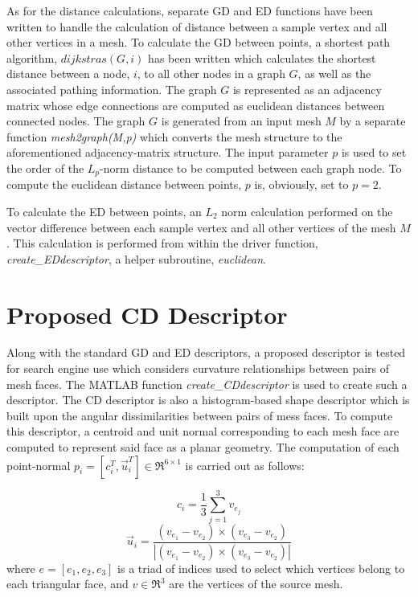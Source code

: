 \documentclass[12pt]{article}
\begin{document}
	\noindent
	As for the distance calculations, separate GD and ED functions have been written to handle the calculation of distance between a sample vertex and all other vertices in a mesh. To calculate the GD between points, a shortest path algorithm, $dijkstras(G,i)$ has been written which calculates the shortest  distance between a node, $i$, to all other nodes in a graph $G$, as well as the associated pathing information. The graph $G$ is represented as an adjacency matrix whose edge connections are computed as euclidean distances between connected nodes. The graph $G$ is generated from an input mesh $M$ by a separate function \emph{mesh2graph(M,p)} which converts the mesh structure to the aforementioned adjacency-matrix structure. The input parameter $p$ is used to set the order of the $L_{p}$-norm distance to be computed between each graph node. To compute the euclidean distance between points, $p$ is, obviously, set to $p=2$.
	
	\noindent
	To calculate the ED between points, an $L_{2}$ norm calculation performed on the vector difference between each \ith sample vertex and all other vertices of the mesh $M$. This calculation is performed from within the driver function, \emph{create\_EDdescriptor}, a helper subroutine, \emph{euclidean}.


\section*{Proposed CD Descriptor}

	\noindent
	Along with the standard GD and ED descriptors, a proposed descriptor is tested for search engine use which considers curvature relationships between pairs of mesh faces. The MATLAB function  \emph{create\_CDdescriptor} is used to create such a descriptor. The CD descriptor is also a histogram-based shape descriptor which is built upon the angular dissimilarities between pairs of mess faces. To compute this descriptor, a centroid and unit normal corresponding to each mesh face are computed to represent said face as a planar geometry. The computation of each \ith point-normal $p_{i} = [ c_{i}^T, \vec{u}_{i}^T ] \in \Re^{6\times1}$ is carried out as follows:

	\begin{equation}
		c_{i} = \frac{1}{3}\sum_{j=1}^{3} v_{e_{j}}
	\end{equation}
	\begin{equation}
		\vec{u}_{i} = \frac{( v_{e_{1}} - v_{e_{2}}) \times ( v_{e_{3}} - v_{e_{2}})}{|( v_{e_{1}} - v_{e_{2}}) \times ( v_{e_{3}} - v_{e_{2}})|}
	\end{equation}
	where $e=[e_{1},e_{2},e_{3}]$ is a triad of indices used to select which vertices belong to each triangular face, and $v\in\Re^{3}$ are the vertices of the source mesh.
\end{document}
